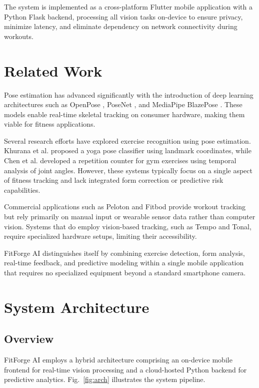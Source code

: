 \documentclass[conference]{IEEEtran}
\begin{document}
The system is implemented as a cross-platform Flutter mobile application with a Python Flask backend, processing all vision tasks on-device to ensure privacy, minimize latency, and eliminate dependency on network connectivity during workouts.

\section{Related Work}

Pose estimation has advanced significantly with the introduction of deep learning architectures such as OpenPose \cite{b4}, PoseNet \cite{b5}, and MediaPipe BlazePose \cite{b6}. These models enable real-time skeletal tracking on consumer hardware, making them viable for fitness applications.

Several research efforts have explored exercise recognition using pose estimation. Khurana et al. \cite{b7} proposed a yoga pose classifier using landmark coordinates, while Chen et al. \cite{b8} developed a repetition counter for gym exercises using temporal analysis of joint angles. However, these systems typically focus on a single aspect of fitness tracking and lack integrated form correction or predictive risk capabilities.

Commercial applications such as Peloton and Fitbod provide workout tracking but rely primarily on manual input or wearable sensor data rather than computer vision. Systems that do employ vision-based tracking, such as Tempo and Tonal, require specialized hardware setups, limiting their accessibility.

FitForge AI distinguishes itself by combining exercise detection, form analysis, real-time feedback, and predictive modeling within a single mobile application that requires no specialized equipment beyond a standard smartphone camera.

\section{System Architecture}

\subsection{Overview}

FitForge AI employs a hybrid architecture comprising an on-device mobile frontend for real-time vision processing and a cloud-hosted Python backend for predictive analytics. Fig.~\ref{fig:arch} illustrates the system pipeline.
\end{document}
